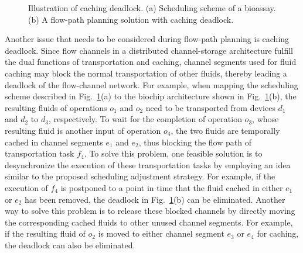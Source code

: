 \begin{figure}[t]
    \centering
    \label{ta}
    \label{tb}
	  \caption{Illustration of caching deadlock. (a) Scheduling scheme of a bioassay. (b) A flow-path planning solution with caching deadlock.}
	  \label{fig:deadlock}
\end{figure}

Another issue that needs to be considered during flow-path planning is caching deadlock. Since flow channels in a distributed channel-storage architecture fulfill the dual functions of transportation and caching, channel segments used for fluid caching may block the normal transportation of other fluids, thereby leading a deadlock of the flow-channel network. For example, when mapping the scheduling scheme described in Fig.~\ref{fig:deadlock}(a) to the biochip architecture shown in Fig.~\ref{fig:deadlock}(b), the resulting fluids of operations $o_1$ and $o_2$ need to be transported from devices $d_1$ and $d_2$ to $d_3$, respectively. To wait for the completion of operation $o_3$, whose resulting fluid is another input of operation $o_4$, the two fluids are temporally cached in channel segments $e_1$ and $e_2$, thus blocking the flow path of transportation task $f_4$. To solve this problem, one feasible solution is to desynchronize the execution of these transportation tasks by employing an idea similar to the proposed scheduling adjustment strategy. For example, if the execution of $f_4$ is postponed to a point in time that the fluid cached in either $e_1$ or $e_2$ has been removed, the deadlock in Fig.~\ref{fig:deadlock}(b) can be eliminated. Another way to solve this problem is to release these blocked channels by directly moving the corresponding cached fluids to other unused channel segments. For example, if the resulting fluid of $o_2$ is moved to either channel segment $e_3$ or $e_4$ for caching, the deadlock can also be eliminated.



